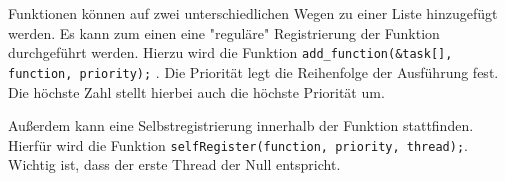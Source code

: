 Funktionen können auf zwei unterschiedlichen Wegen zu einer Liste hinzugefügt werden. 
Es kann zum einen eine "reguläre" Registrierung der Funktion durchgeführt werden. Hierzu wird die Funktion \texttt{add_function(&task[], function, priority);} . Die Priorität legt die Reihenfolge der Ausführung fest. Die höchste Zahl stellt hierbei auch die höchste Priorität um. 

Außerdem kann eine Selbstregistrierung innerhalb der Funktion stattfinden. Hierfür wird die Funktion \texttt{selfRegister(function, priority, thread);}. Wichtig ist, dass der erste Thread der Null entspricht. 